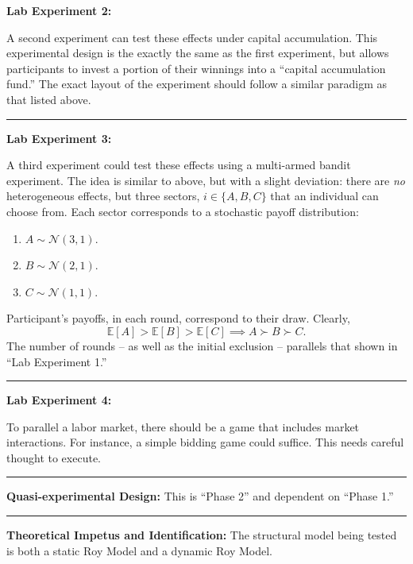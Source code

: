 \documentclass[17pt]{extarticle}  %
\begin{document}
\noindent\textbf{Lab Experiment 2:} 

A second experiment can test these effects under capital accumulation. This experimental design is the exactly the same as the first experiment, but allows participants to invest a portion of their winnings into a \enquote{capital accumulation fund.} The exact layout of the experiment should follow a similar paradigm as that listed above. 


\noindent\rule{\linewidth}{0.4pt}

\noindent\textbf{Lab Experiment 3:} 

A third experiment could test these effects using a multi-armed bandit experiment. The idea is similar to above, but with a slight deviation: there are \emph{no} heterogeneous effects, but three sectors, $i \in \{A, B, C\}$ that an individual can choose from. Each sector corresponds to a stochastic payoff distribution:
\begin{enumerate}
\item $A \sim \mathcal{N}(3,1)$.
\item $B \sim \mathcal{N}(2,1)$.
\item $C \sim \mathcal{N}(1,1)$.
\end{enumerate}
Participant's payoffs, in each round, correspond to their draw. Clearly,
\[
\mathbb{E}[A] >\mathbb{E}[B] >\mathbb{E}[C] \implies A \succ B \succ C.
\]
The number of rounds -- as well as the initial exclusion -- parallels that shown in \enquote{Lab Experiment 1.}

\noindent\rule{\linewidth}{0.4pt}

\noindent\textbf{Lab Experiment 4:} 


To parallel a labor market, there should be a game that includes market interactions. For instance, a simple bidding game could suffice. This needs careful thought to execute. 

\noindent\rule{\linewidth}{0.4pt}

\noindent\textbf{Quasi-experimental Design:} 
This is \enquote{Phase 2} and dependent on \enquote{Phase 1.}

\noindent\rule{\linewidth}{0.4pt}

\noindent\textbf{Theoretical Impetus and Identification:} 
The structural model being tested is both a static Roy Model and a dynamic Roy Model. 



%
%
\end{document}
